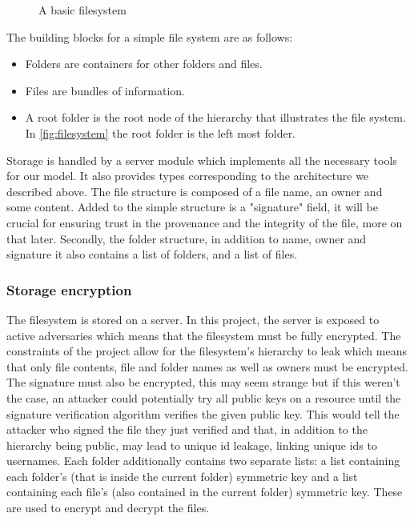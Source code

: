 \begin{minipage}{1\textwidth}
    \begin{figure}[H]
        \centering
        
        \caption{\label{fig:filesystem} A basic filesystem }
    \end{figure}
\end{minipage}

The building blocks for a simple file system are as follows:
\begin{itemize}
    \item Folders are containers for other folders and files.
    \item Files are bundles of information.
    \item A root folder is the root node of the hierarchy that illustrates the file system. In \autoref{fig:filesystem} the root folder is the left most folder.
\end{itemize}

Storage is handled by a server module which implements all the necessary tools for our model. It also provides types corresponding to the architecture we described above. The file structure is composed of a file name, an owner and some content. Added to the simple structure is a "signature" field, it will be crucial for ensuring trust in the provenance and the integrity of the file, more on that later. Secondly, the folder structure, in addition to name, owner and signature it also contains a list of folders, and a list of files.

\subsubsection{Storage encryption}
The filesystem is stored on a server. In this project, the server is exposed to active adversaries which means that the filesystem must be fully encrypted. The constraints of the project allow for the filesystem's hierarchy to leak which means that only file contents, file and folder names as well as owners must be encrypted. The signature must also be encrypted, this may seem strange but if this weren't the case, an attacker could potentially try all public keys on a resource until the signature verification algorithm verifies the given public key. This would tell the attacker who signed the file they just verified and that, in addition to the hierarchy being public, may lead to unique id leakage, linking unique ids to usernames. Each folder additionally contains two separate lists: a list containing each folder's (that is inside the current folder) symmetric key and a list containing each file's (also contained in the current folder) symmetric key. These are used to encrypt and decrypt the files. 

